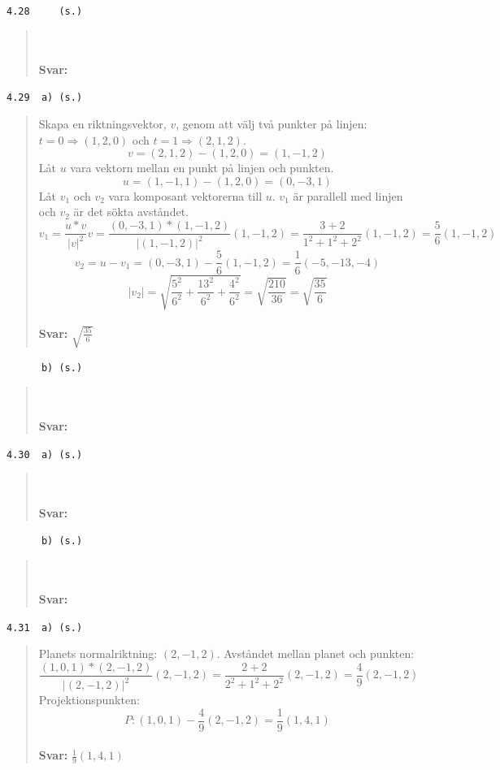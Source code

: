 \documentclass[a4paper]{article}
\newcommand{\tskcol}[1]{\textcolor{tskcol}{#1}}
\begin{document}
\texttt{\tskcol{4.28~~~~ (s.)}}
\begin{quotation}
	\noindent
	\\ \\
	\textbf{Svar:}
\end{quotation}

\texttt{\tskcol{4.29~~a) (s.)}}
\begin{quotation}
	\noindent
	Skapa en riktningsvektor, $v$, genom att välj två punkter på linjen: $t=0 \Rightarrow (1,2,0)$ och $t=1 \Rightarrow (2,1,2)$.
	\[v=(2,1,2)-(1,2,0)=(1,-1,2)\]
	Låt $u$ vara vektorn mellan en punkt på linjen och punkten.
	\[u=(1,-1,1)-(1,2,0)=(0,-3,1)\]
	Låt $v_1$ och $v_2$ vara komposant vektorerna till $u$. $v_1$ är parallell med linjen och $v_2$ är det sökta avståndet.
	\[v_1=\frac{u*v}{|v|^2}v=
	\frac{(0,-3,1)*(1,-1,2)}{|(1,-1,2)|^2}(1,-1,2)=
	\frac{3+2}{1^2+1^2+2^2}(1,-1,2)=
	\frac{5}{6}(1,-1,2)\]
	\[v_2=u-v_1=
	(0,-3,1)-\frac{5}{6}(1,-1,2)=
	\frac{1}{6}(-5,-13,-4)\]
	\[|v_2|=\sqrt{\frac{5^2}{6^2}+\frac{13^2}{6^2}+\frac{4^2}{6^2}}=
	\sqrt{\frac{210}{36}}=
	\sqrt{\frac{35}{6}}\]
	\\
	\textbf{Svar:} $\sqrt{\frac{35}{6}}$
\end{quotation}

\texttt{\tskcol{~~~~~~b) (s.)}}
\begin{quotation}
	\noindent
	\\ \\
	\textbf{Svar:}
\end{quotation}

\texttt{\tskcol{4.30~~a) (s.)}}
\begin{quotation}
	\noindent
	\\ \\
	\textbf{Svar:}
\end{quotation}

\texttt{\tskcol{~~~~~~b) (s.)}}
\begin{quotation}
	\noindent
	\\ \\
	\textbf{Svar:}
\end{quotation}

\texttt{\tskcol{4.31~~a) (s.)}}
\begin{quotation}
	\noindent
	Planets normalriktning: $(2,-1,2)$.
	Avståndet mellan planet och punkten:
	\[\frac{(1,0,1)*(2,-1,2)}{|(2,-1,2)|^2}(2,-1,2)=
	\frac{2+2}{2^2+1^2+2^2}(2,-1,2)=
	\frac{4}{9}(2,-1,2)\]
	Projektionspunkten:
	\[P:(1,0,1)-\frac{4}{9}(2,-1,2)=\frac{1}{9}(1,4,1)\]
	\\
	\textbf{Svar:} $\frac{1}{9}(1,4,1)$
\end{quotation}
\end{document}
